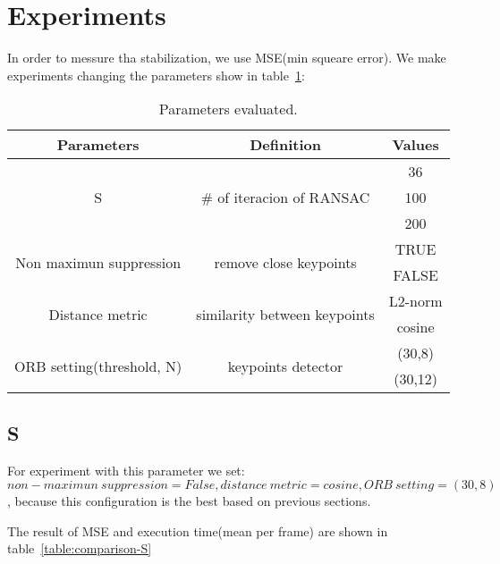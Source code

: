 \section{Experiments}

In order to messure tha stabilization, we use MSE(min squeare error). We make experiments changing the parameters show in table~\ref{table:setting-parameters}:

\begin{table}[]
\centering
\begin{tabular}{|c|c|c|}
\hline
\textbf{Parameters} & \textbf{Definition} & \textbf{Values} \\ \hline
\multirow{3}{*}{S} & \multirow{3}{*}{\# of iteracion of RANSAC} & 36 \\ \cline{3-3} 
 &  & 100 \\ \cline{3-3} 
 &  & 200 \\ \hline
\multirow{2}{*}{Non maximun suppression} & \multirow{2}{*}{remove close keypoints} & TRUE \\ \cline{3-3} 
 &  & FALSE \\ \hline
\multirow{2}{*}{Distance metric} & \multirow{2}{*}{similarity between keypoints} & L2-norm \\ \cline{3-3} 
 &  & cosine \\ \hline
\multirow{2}{*}{ORB setting(threshold, N)} & \multirow{2}{*}{keypoints detector} & (30,8) \\ \cline{3-3} 
 &  & (30,12) \\ \hline
\end{tabular}
\caption{Parameters evaluated.}
\label{table:setting-parameters}
\end{table}
    

\subsection{S}

For experiment with this parameter we set: $non-maximun~suppression=False, distance~metric=cosine, ORB~ setting = (30,8)$, because this configuration is the best based on previous sections.

The result of MSE and execution time(mean per frame) are shown in table~\ref{table:comparison-S}

